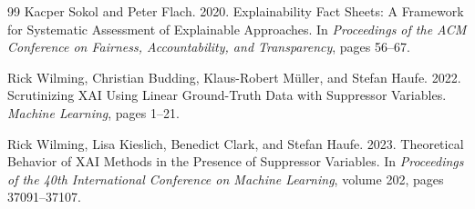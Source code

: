 \documentclass[twoside,11pt]{article}
\begin{document}
\begin{thebibliography}{99}
Kacper Sokol and Peter Flach.
2020.
Explainability Fact Sheets: A Framework for Systematic Assessment of Explainable
Approaches.
In \emph{Proceedings of the ACM Conference on Fairness, Accountability, and
Transparency}, pages 56--67.

Rick Wilming, Christian Budding, Klaus-Robert M{\"u}ller, and Stefan Haufe.
2022.
Scrutinizing {XAI} Using Linear Ground-Truth Data with Suppressor Variables.
\emph{Machine Learning}, pages 1--21.

Rick Wilming, Lisa Kieslich, Benedict Clark, and Stefan Haufe.
2023.
Theoretical Behavior of {XAI} Methods in the Presence of Suppressor Variables.
In \emph{Proceedings of the 40th International Conference on Machine Learning},
volume 202, pages 37091--37107.

\end{thebibliography}
\end{document}
